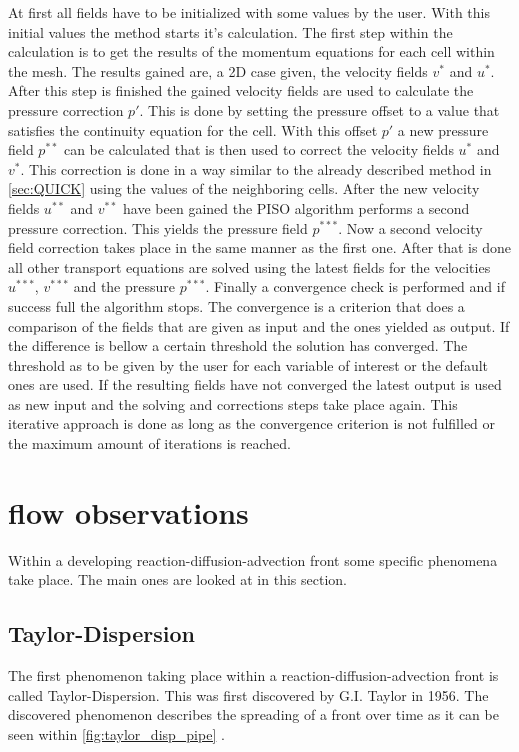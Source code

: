 \documentclass[../thesis.tex]{subfiles}
\begin{document}
At first all fields have to be initialized with some values by the user. With this initial values the method starts it's calculation. The first step within the calculation is to get the results of the momentum equations for each cell within the mesh. The results gained are, a 2D case given, the velocity fields $v^*$ and $u^*$. After this step is finished the gained velocity fields are used to calculate the pressure correction $p'$. This is done by setting the pressure offset to a value that satisfies the continuity equation for the cell. With this offset $p'$ a new pressure field $p^{**}$ can be calculated that is then used to correct the velocity fields $u^*$ and $v^*$. This correction is done in a way similar to the already described method in \autoref{sec:QUICK} using the values of the neighboring cells. After the new velocity fields $u^{**}$ and $v^{**}$ have been gained the PISO algorithm performs a second pressure correction. This yields the pressure field $p^{***}$. Now a second velocity field correction takes place in the same manner as the first one. After that is done all other transport equations are solved using the latest fields for the velocities $u^{***}$, $v^{***}$ and the pressure $p^{***}$. Finally a convergence check is performed and if success full the algorithm stops. The convergence is a criterion that does a comparison of the fields that are given as input and the ones yielded as output. If the difference is bellow a certain threshold the solution has converged. The threshold as to be given by the user for each variable of interest or the default ones are used. If the resulting fields have not converged the latest output is used as new input and the solving and corrections steps take place again. This iterative approach is done as long as the convergence criterion is not fulfilled or the maximum amount of iterations is reached.


\section{flow observations}

Within a developing reaction-diffusion-advection front some specific phenomena take place. The main ones are looked at in this section.

\subsection{Taylor-Dispersion}

The first phenomenon taking place within a reaction-diffusion-advection front is called Taylor-Dispersion. This was first discovered by G.I. Taylor\cite{aris1956dispersion} in 1956. The discovered phenomenon describes the spreading of a front over time as it can be seen within \autoref{fig:taylor_disp_pipe} . 
\end{document}
